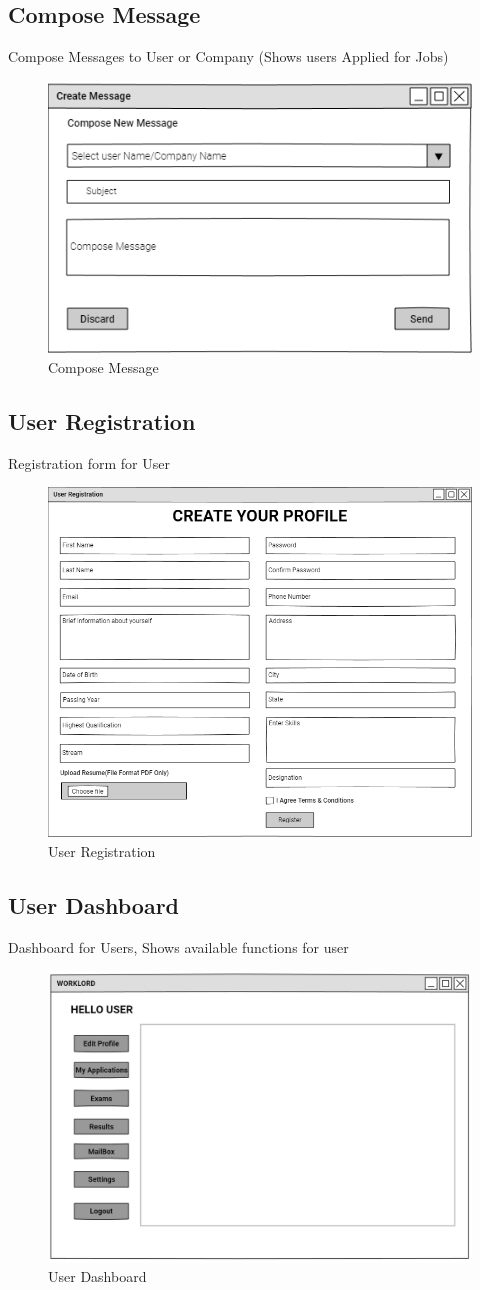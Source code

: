 \documentclass[a4paper,12pt]{report}
\begin{document}
\subsection {Compose Message}
Compose Messages to User or Company (Shows users Applied for Jobs)
\begin{figure}[bph]
	\centering
	\includegraphics[width=.5\linewidth]{img/create_msg}
	\caption{Compose Message}
\end{figure}
\subsection {User Registration}
Registration form for User
\begin{figure}[bph]
	\centering
	\includegraphics[width=.6\linewidth ]{img/user/user_registration}
	\caption{User Registration}
\end{figure}
\pagebreak

\subsection {User Dashboard}
Dashboard for Users, Shows available functions for user
\begin{figure}[bph]
	\centering
	\includegraphics[width=.8\linewidth]{img/user/userhme}
	\caption{User Dashboard}
\end{figure}
\pagebreak
\end{document}
